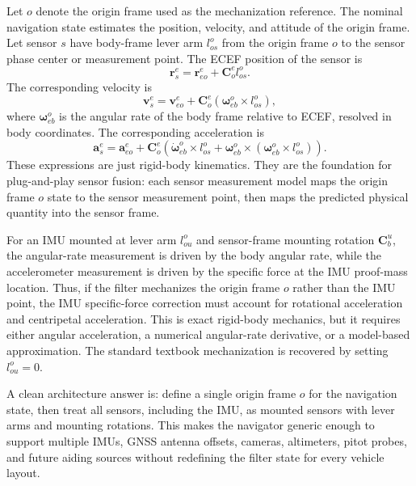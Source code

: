 \documentclass[11pt,oneside]{book}
\newcommand{\vb}{\mathbf{v}}
\newcommand{\rb}{\mathbf{r}}
\newcommand{\ab}{\mathbf{a}}
\newcommand{\Coe}{\mathbf{C}^{e}_{o}}
\begin{document}
Let $o$ denote the origin frame used as the mechanization reference. The nominal navigation state estimates the position, velocity, and attitude of the origin frame. Let sensor $s$ have body-frame lever arm $l_{os}^o$ from the origin frame $o$ to the sensor phase center or measurement point. The ECEF position of the sensor is
\begin{equation}
\rb_s^e = \rb_{eo}^e + \Coe l_{os}^o.
\label{eq:nrp_sensor_position}
\end{equation}
The corresponding velocity is
\begin{equation}
\vb_s^e = \vb_{eo}^e + \Coe\left(\boldsymbol\omega_{eb}^o \times l_{os}^o\right),
\label{eq:nrp_sensor_velocity}
\end{equation}
where $\boldsymbol\omega_{eb}^o$ is the angular rate of the body frame relative to ECEF, resolved in body coordinates. The corresponding acceleration is
\begin{equation}
\ab_s^e = \ab_{eo}^e + \Coe\left(\dot{\boldsymbol\omega}_{eb}^o \times l_{os}^o + \boldsymbol\omega_{eb}^o \times \left(\boldsymbol\omega_{eb}^o \times l_{os}^o\right)\right).
\label{eq:nrp_sensor_accel}
\end{equation}
These expressions are just rigid-body kinematics. They are the foundation for plug-and-play sensor fusion: each sensor measurement model maps the origin frame $o$ state to the sensor measurement point, then maps the predicted physical quantity into the sensor frame.

For an IMU mounted at lever arm $l_{ou}^o$ and sensor-frame mounting rotation $\mathbf{C}_b^u$, the angular-rate measurement is driven by the body angular rate, while the accelerometer measurement is driven by the specific force at the IMU proof-mass location. Thus, if the filter mechanizes the origin frame $o$ rather than the IMU point, the IMU specific-force correction must account for rotational acceleration and centripetal acceleration. This is exact rigid-body mechanics, but it requires either angular acceleration, a numerical angular-rate derivative, or a model-based approximation. The standard textbook mechanization is recovered by setting $l_{ou}^o=0$.

\begin{interviewbox}
A clean architecture answer is: define a single origin frame $o$ for the navigation state, then treat all sensors, including the IMU, as mounted sensors with lever arms and mounting rotations. This makes the navigator generic enough to support multiple IMUs, GNSS antenna offsets, cameras, altimeters, pitot probes, and future aiding sources without redefining the filter state for every vehicle layout.
\end{interviewbox}
\end{document}
